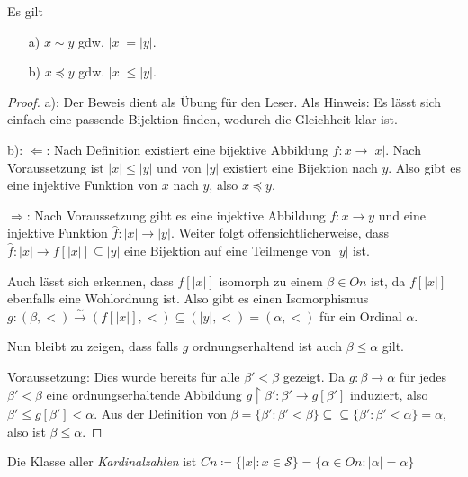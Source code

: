 \begin{lemma}
	Es gilt
	\begin{itemize}
		\item[a)] $x\sim y$ gdw. $\vert x \vert = \vert y \vert$.
		\item[b)] $x\preceq y$ gdw. $\vert x \vert \leq \vert y \vert$.
	\end{itemize}
\end{lemma}
\begin{proof}
	a): Der Beweis dient als Übung für den Leser. Als Hinweis: Es lässt sich einfach eine passende Bijektion finden, wodurch die Gleichheit klar ist.
	\par
	b): $\Leftarrow$: Nach Definition existiert eine bijektive Abbildung $f:x\to\vert x \vert$. Nach Voraussetzung ist $\vert x \vert \leq \vert y \vert$ und von $\vert y \vert$ existiert eine Bijektion nach $y$. Also gibt es eine injektive Funktion von $x$ nach $y$, also $x\preceq y$.
	\par
	$\Rightarrow$: Nach Voraussetzung gibt es eine injektive Abbildung $f:x\to y$ und eine injektive Funktion $\hat f:\vert x \vert \to \vert  y \vert$. Weiter folgt offensichtlicherweise, dass $\hat f : \vert x \vert \to f[\vert x \vert]\subseteq \vert y \vert$ eine Bijektion auf eine Teilmenge von $\vert y \vert$ ist.
	
	Auch lässt sich erkennen, dass $f[\vert x \vert]$ isomorph zu einem $\beta\in On$ ist, da $f[\vert x\vert]$ ebenfalls eine Wohlordnung ist. Also gibt es einen Isomorphismus $g:(\beta, <)\xrightarrow{\sim}(f[\vert x \vert], <)\subseteq (\vert y \vert, <)=(\alpha, <)$ für ein Ordinal $\alpha$.
	
	Nun bleibt zu zeigen, dass falls $g$ ordnungserhaltend ist auch $\beta \leq \alpha$ gilt.
	
	Voraussetzung: Dies wurde bereits für alle $\beta'<\beta$ gezeigt. Da $g:\beta\to\alpha$ für jedes $\beta'<\beta$ eine ordnungserhaltende Abbildung $g\upharpoonright\beta':\beta'\to g[\beta']$ induziert, also $\beta'\leq g[\beta']< \alpha$. Aus der Definition von $\beta=\{\beta':\beta'<\beta\}\subseteq \subseteq\{\beta':\beta'<\alpha\}=\alpha$, also ist $\beta\leq\alpha$.
\end{proof}

\begin{definition}[Kardinalzahlen]
	Die Klasse aller \textit{Kardinalzahlen} ist $Cn\coloneqq\{\vert x \vert : x\in \mathcal{S}\}=\{\alpha\in On : \vert\alpha\vert=\alpha\}$
\end{definition}

